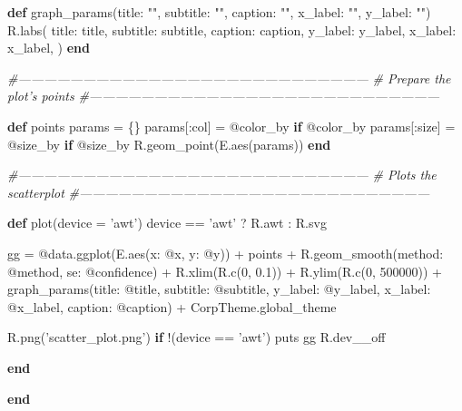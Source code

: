 \documentclass[]{article}
\newenvironment{Shaded}{\begin{snugshade}}{\end{snugshade}}
\newcommand{\KeywordTok}[1]{\textcolor[rgb]{0.13,0.29,0.53}{\textbf{#1}}}
\newcommand{\DataTypeTok}[1]{\textcolor[rgb]{0.13,0.29,0.53}{#1}}
\newcommand{\DecValTok}[1]{\textcolor[rgb]{0.00,0.00,0.81}{#1}}
\newcommand{\FloatTok}[1]{\textcolor[rgb]{0.00,0.00,0.81}{#1}}
\newcommand{\StringTok}[1]{\textcolor[rgb]{0.31,0.60,0.02}{#1}}
\newcommand{\CommentTok}[1]{\textcolor[rgb]{0.56,0.35,0.01}{\textit{#1}}}
\newcommand{\OtherTok}[1]{\textcolor[rgb]{0.56,0.35,0.01}{#1}}
\newcommand{\NormalTok}[1]{#1}
\begin{document}
\begin{Shaded}
\begin{Highlighting}[]
  \KeywordTok{def}\NormalTok{ graph_params(}\StringTok{title: ""}\NormalTok{, }\StringTok{subtitle: ""}\NormalTok{, }\StringTok{caption: ""}\NormalTok{, }\StringTok{x_label: ""}\NormalTok{, }\StringTok{y_label: ""}\NormalTok{)}
\NormalTok{    R.labs(}
      \StringTok{title: }\NormalTok{title, }
      \StringTok{subtitle: }\NormalTok{subtitle, }
      \StringTok{caption: }\NormalTok{caption,}
      \StringTok{y_label: }\NormalTok{y_label, }
      \StringTok{x_label: }\NormalTok{x_label, }
\NormalTok{    )}
  \KeywordTok{end}

  \CommentTok{#---------------------------------------------------------------------------------}
  \CommentTok{# Prepare the plot's points}
  \CommentTok{#---------------------------------------------------------------------------------}

  \KeywordTok{def}\NormalTok{ points}
\NormalTok{    params = \{\}}
\NormalTok{    params[}\StringTok{:col}\NormalTok{] = }\OtherTok{@color_by} \KeywordTok{if} \OtherTok{@color_by}
\NormalTok{    params[}\StringTok{:size}\NormalTok{] = }\OtherTok{@size_by} \KeywordTok{if} \OtherTok{@size_by}
\NormalTok{    R.geom_point(E.aes(params))}
  \KeywordTok{end}
      
  \CommentTok{#---------------------------------------------------------------------------------}
  \CommentTok{# Plots the scatterplot}
  \CommentTok{#---------------------------------------------------------------------------------}

  \KeywordTok{def}\NormalTok{ plot(device = }\StringTok{'awt'}\NormalTok{)}
\NormalTok{    device == }\StringTok{'awt'}\NormalTok{ ? R.awt : R.svg}
   
\NormalTok{    gg = }\OtherTok{@data}\NormalTok{.ggplot(E.aes(}\StringTok{x: }\OtherTok{@x}\NormalTok{, }\StringTok{y: }\OtherTok{@y}\NormalTok{)) +}
\NormalTok{      points + }
\NormalTok{      R.geom_smooth(}\StringTok{method: }\OtherTok{@method}\NormalTok{, }\StringTok{se: }\OtherTok{@confidence}\NormalTok{) +}
\NormalTok{      R.xlim(R.c(}\DecValTok{0}\NormalTok{, }\FloatTok{0.1}\NormalTok{)) +}
\NormalTok{      R.ylim(R.c(}\DecValTok{0}\NormalTok{, }\DecValTok{500000}\NormalTok{)) + }
\NormalTok{      graph_params(}\StringTok{title: }\OtherTok{@title}\NormalTok{,}
                   \StringTok{subtitle: }\OtherTok{@subtitle}\NormalTok{, }
                   \StringTok{y_label: }\OtherTok{@y_label}\NormalTok{, }
                   \StringTok{x_label: }\OtherTok{@x_label}\NormalTok{, }
                   \StringTok{caption: }\OtherTok{@caption}\NormalTok{) +}
      \DataTypeTok{CorpTheme}\NormalTok{.global_theme}

\NormalTok{    R.png(}\StringTok{'scatter_plot.png'}\NormalTok{) }\KeywordTok{if}\NormalTok{ !(device == }\StringTok{'awt'}\NormalTok{)}
\NormalTok{    puts gg}
\NormalTok{    R.dev__off}
    
  \KeywordTok{end}
  
\KeywordTok{end}
\end{Highlighting}
\end{Shaded}
\end{document}

